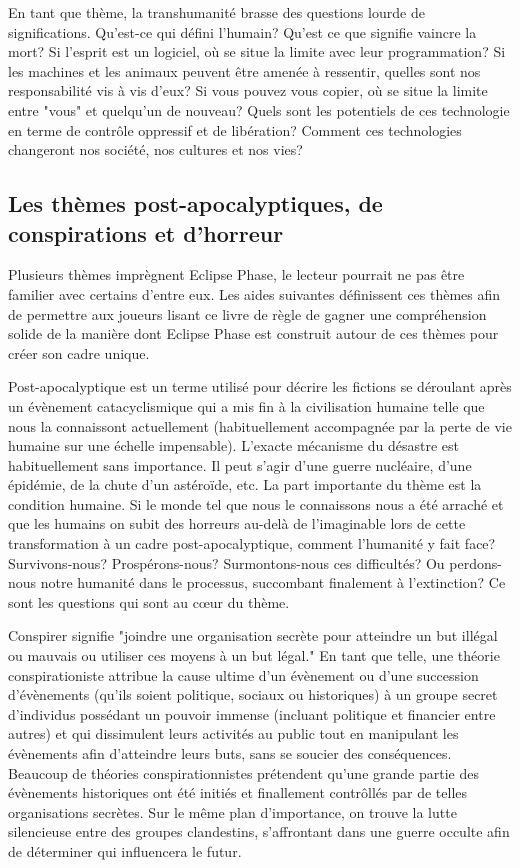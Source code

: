 En tant que thème, la transhumanité brasse des questions lourde de significations. Qu'est-ce qui défini l'humain? Qu'est ce que signifie vaincre la mort? Si l'esprit est un logiciel, où se situe la limite avec leur programmation? Si les machines et les animaux peuvent être amenée à ressentir, quelles sont nos responsabilité vis à vis d'eux? Si vous pouvez vous copier, où se situe la limite entre "vous" et quelqu'un de nouveau? Quels sont les potentiels de ces technologie en terme de contrôle oppressif et de libération? Comment ces technologies changeront nos société, nos cultures et nos vies? 



\subsection{Les thèmes post-apocalyptiques, de conspirations et d'horreur} \label{sec:post-apoc-consp} 

Plusieurs thèmes imprègnent Eclipse Phase, le lecteur pourrait ne pas être familier avec certains d'entre eux. Les aides suivantes définissent ces thèmes afin de permettre aux joueurs lisant ce livre de règle de gagner une compréhension solide de la manière dont Eclipse Phase est construit autour de ces thèmes pour créer son cadre unique. 

Post-apocalyptique est un terme utilisé pour décrire les fictions se déroulant après un évènement catacyclismique qui a mis fin à la civilisation humaine telle que nous la connaissont actuellement (habituellement accompagnée par la perte de vie humaine sur une échelle impensable). L'exacte mécanisme du désastre est habituellement sans importance. Il peut s'agir d'une guerre nucléaire, d'une épidémie, de la chute d'un astéroïde, etc. La part importante du thème est la condition humaine. Si le monde tel que nous le connaissons nous a été arraché et que les humains on subit des horreurs au-delà de l'imaginable lors de cette transformation à un cadre post-apocalyptique, comment l'humanité y fait face? Survivons-nous? Prospérons-nous? Surmontons-nous ces difficultés? Ou perdons-nous notre humanité dans le processus, succombant finalement à l'extinction? Ce sont les questions qui sont au cœur du thème. 

Conspirer signifie "joindre une organisation secrète pour atteindre un but illégal ou mauvais ou utiliser ces moyens à un but légal." En tant que telle, une théorie conspirationiste attribue la cause ultime d'un évènement ou d'une succession d'évènements (qu'ils soient politique, sociaux ou historiques) à un groupe secret d'individus possédant un pouvoir immense (incluant politique et financier entre autres) et qui dissimulent leurs activités au public tout en manipulant les évènements afin d'atteindre leurs buts, sans se soucier des conséquences. Beaucoup de théories conspirationnistes prétendent qu'une grande partie des évènements historiques ont été initiés et finallement contrôllés par de telles organisations secrètes. Sur le même plan d'importance, on trouve la lutte silencieuse entre des groupes clandestins, s'affrontant dans une guerre occulte afin de déterminer qui influencera le futur. 


